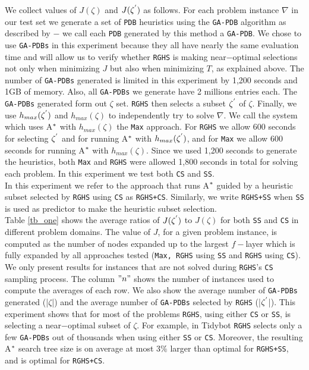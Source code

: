 We collect values of $J(\zeta)$ and $J(\zeta\sp{'})$ as follows. For each problem instance $\nabla$ in our test set we generate a set of \texttt{PDB} heuristics using the \texttt{GA-PDB} algorithm \cite{edelkamp2007automated} as described by \cite{BarleySantiagoOver} $-$ we call each \texttt{PDB} generated by this method a \texttt{GA-PDB}. We chose to use \texttt{GA-PDBs} in this experiment because they all have nearly the same evaluation time and will allow us to verify whether \texttt{RGHS} is making near$-$optimal selections not only when minimizing $J$ but also when minimizing $T$, as explained above. The number of \texttt{GA-PDBs} generated is limited in this experiment by 1,200 seconds and 1GB of memory. Also, all \texttt{GA-PDBs} we generate have 2 millions entries each. The \texttt{GA-PDBs} generated form out $\zeta$ set. \texttt{RGHS} then selects a subset $\zeta\sp{'}$ of $\zeta$. Finally, we use $h_{max}(\zeta\sp{'})$ and $h_{max}(\zeta)$ to independently try to solve $\nabla$. We call the system which uses A$\sp{*}$ with $h_{max}(\zeta)$ the \texttt{Max} approach. For \texttt{RGHS} we allow 600 seconds for selecting $\zeta\sp{'}$ and for running A$\sp{*}$ with $h_{max}(\zeta\sp{'})$, and for \texttt{Max} we allow 600 seconds for running A$\sp{*}$ with $h_{max}(\zeta)$. Since we used 1,200 seconds to generate the heuristics, both \texttt{Max} and \texttt{RGHS} were allowed 1,800 seconds in total for solving each problem. In this experiment we test both \texttt{CS} and \texttt{SS}.\\

In this experiment we refer to the approach that runs A$\sp{*}$ guided by a heuristic subset selected by \texttt{RGHS} using \texttt{CS} as \texttt{RGHS+CS}. Similarly, we write \texttt{RGHS+SS} when \texttt{SS} is used as predictor to make the heuristic subset selection.\\

Table \ref{tb_one} shows the average ratios of $J(\zeta\sp{'})$ to $J(\zeta)$ for both \texttt{SS} and \texttt{CS} in different problem domains. The value of $J$, for a given problem instance, is computed as the number of nodes expanded up to the largest $f-$layer which is fully expanded by all approaches tested (\texttt{Max, RGHS} using \texttt{SS} and \texttt{RGHS} using \texttt{CS}). We only present results for instances that are not solved during \texttt{RGHS}'s \texttt{CS} sampling process. The column $"n"$ shows the number of instances used to compute the averages of each row. We also show the average number of \texttt{GA-PDBs} generated (|$\zeta$|) and the average number of \texttt{GA-PDBs} selected by \texttt{RGHS} (|$\zeta\sp{'}$|). This experiment shows that for most of the problems \texttt{RGHS}, using either \texttt{CS} or \texttt{SS}, is selecting a near$-$optimal subset of $\zeta$. For example, in Tidybot \texttt{RGHS} selects only a few \texttt{GA-PDBs} out of thousands when using either \texttt{SS} or \texttt{CS}. Moreover, the resulting A$\sp{*}$ search tree size is on average at most 3$\%$ larger than optimal for \texttt{RGHS+SS}, and is optimal for \texttt{RGHS+CS}.\\

